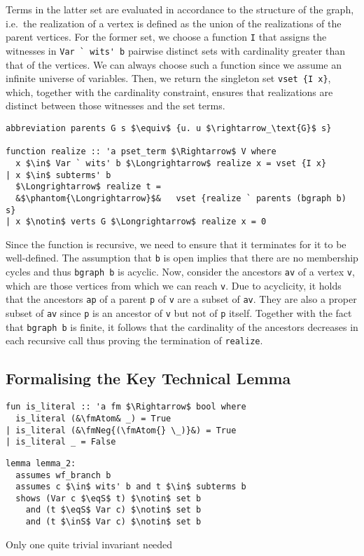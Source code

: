 \documentclass[sigplan,10pt,anonymous,review]{acmart}
\newcommand{\inS}{\in_\text{s}}
\newcommand{\eqS}{=_\text{s}}
\newcommand{\fmNeg}[1]{$\boldsymbol{\neg}$ #1}
\newcommand{\fmAtom}{\textbf{A}}
\begin{document}
Terms in the latter set are evaluated in accordance to the structure of the graph, i.e.\ the realization of a vertex is defined as the union of the realizations of the parent vertices. 
For the former set, we choose a function \lstinline!I! that assigns the witnesses in \lstinline!Var ` wits' b! pairwise distinct sets with cardinality greater than that of the vertices.
We can always choose such a function since we assume an infinite universe of variables.
Then, we return the singleton set \lstinline!vset {I x}!, which, together with the cardinality constraint, ensures that realizations are distinct between those witnesses and the set terms.  
\begin{lstlisting}
abbreviation parents G s $\equiv$ {u. u $\rightarrow_\text{G}$ s}

function realize :: 'a pset_term $\Rightarrow$ V where
  x $\in$ Var ` wits' b $\Longrightarrow$ realize x = vset {I x}
| x $\in$ subterms' b
  $\Longrightarrow$ realize t =
  &$\phantom{\Longrightarrow}$&   vset {realize ` parents (bgraph b) s}
| x $\notin$ verts G $\Longrightarrow$ realize x = 0
\end{lstlisting}
Since the function is recursive, we need to ensure that it terminates for it to be well-defined.
The assumption that \lstinline!b! is open implies that there are no membership cycles and thus \lstinline!bgraph b! is acyclic.
Now, consider the ancestors \lstinline!av! of a vertex \lstinline!v!, which are those vertices from which we can reach \lstinline!v!.
Due to acyclicity, it holds that the ancestors \lstinline!ap! of a parent \lstinline!p! of \lstinline!v! are a subset of \lstinline!av!.
They are also a proper subset of \lstinline!av! since \lstinline!p! is an ancestor of \lstinline!v! but not of \lstinline!p! itself.
Together with the fact that \lstinline!bgraph b! is finite, it follows that the cardinality of the ancestors decreases in each recursive call thus proving the termination of \lstinline!realize!.

\subsection{Formalising the Key Technical Lemma}
\begin{lstlisting}
fun is_literal :: 'a fm $\Rightarrow$ bool where
  is_literal (&\fmAtom& _) = True
| is_literal (&\fmNeg{(\fmAtom{} \_)}&) = True
| is_literal _ = False
\end{lstlisting}

\begin{lstlisting}
lemma lemma_2:
  assumes wf_branch b
  assumes c $\in$ wits' b and t $\in$ subterms b
  shows (Var c $\eqS$ t) $\notin$ set b
    and (t $\eqS$ Var c) $\notin$ set b
    and (t $\inS$ Var c) $\notin$ set b
\end{lstlisting}
Only one quite trivial invariant needed 
\end{document}
